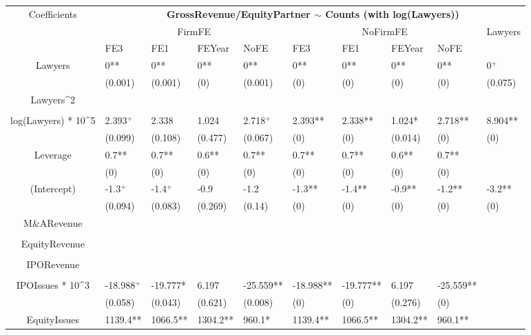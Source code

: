 \documentclass{article}
\begin{document}
\begin{table}[H]
\centering
\begin{tabular}{|clllllllll|}
\hline
\multirow{3}{*}{Coefficients} & \multicolumn{9}{c|}{\textbf{GrossRevenue/EquityPartner $\sim$ Counts (with log(Lawyers))}} \\
\cline{2-10}
& \multicolumn{4}{c}{FirmFE} & \multicolumn{4}{c}{NoFirmFE} & \multirow{2}{*}{Lawyers} \\
\cline{2-9}
& FE3 & FE1 & FEYear & NoFE & FE3 & FE1 & FEYear & NoFE &  \\
\hline
 
Lawyers & 0** & 0** & 0** & 0** & 0** & 0** & 0** & 0** & 0$^{+}$ \\ 
   & (0.001) & (0.001) & (0) & (0.001) & (0) & (0) & (0) & (0) & (0.075) \\ 
  Lawyers^2 &  &  &  &  &  &  &  &  &  \\ 
   &  &  &  &  &  &  &  &  &  \\ 
  log(Lawyers) * 10^5 & 2.393$^{+}$ & 2.338 & 1.024 & 2.718$^{+}$ & 2.393** & 2.338** & 1.024* & 2.718** & 8.904** \\ 
   & (0.099) & (0.108) & (0.477) & (0.067) & (0) & (0) & (0.014) & (0) & (0) \\ 
  Leverage & 0.7** & 0.7** & 0.6** & 0.7** & 0.7** & 0.7** & 0.6** & 0.7** &  \\ 
   & (0) & (0) & (0) & (0) & (0) & (0) & (0) & (0) &  \\ 
  (Intercept) & -1.3$^{+}$ & -1.4$^{+}$ & -0.9 & -1.2 & -1.3** & -1.4** & -0.9** & -1.2** & -3.2** \\ 
   & (0.094) & (0.083) & (0.269) & (0.14) & (0) & (0) & (0) & (0) & (0) \\ 
  M\&ARevenue &  &  &  &  &  &  &  &  &  \\ 
   &  &  &  &  &  &  &  &  &  \\ 
  EquityRevenue &  &  &  &  &  &  &  &  &  \\ 
   &  &  &  &  &  &  &  &  &  \\ 
  IPORevenue &  &  &  &  &  &  &  &  &  \\ 
   &  &  &  &  &  &  &  &  &  \\ 
  IPOIssues * 10^3 & -18.988$^{+}$ & -19.777* & 6.197 & -25.559** & -18.988** & -19.777** & 6.197 & -25.559** &  \\ 
   & (0.058) & (0.043) & (0.621) & (0.008) & (0) & (0) & (0.276) & (0) &  \\ 
  EquityIssues & 1139.4** & 1066.5** & 1304.2** & 960.1* & 1139.4** & 1066.5** & 1304.2** & 960.1** &  \\ 

\end{tabular}
\end{table}
\end{document}
